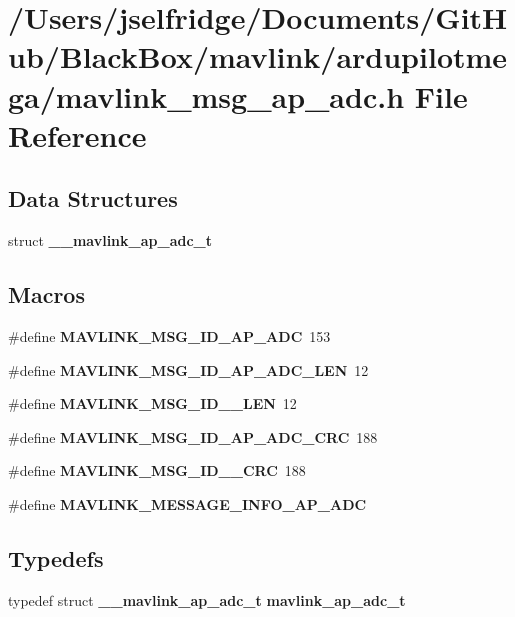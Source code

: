\section{/\+Users/jselfridge/\+Documents/\+Git\+Hub/\+Black\+Box/mavlink/ardupilotmega/mavlink\+\_\+msg\+\_\+ap\+\_\+adc.h File Reference}
\label{mavlink__msg__ap__adc_8h}
\subsection*{Data Structures}
\begin{DoxyCompactItemize}
\item 
struct \textbf{ \+\_\+\+\_\+mavlink\+\_\+ap\+\_\+adc\+\_\+t}
\end{DoxyCompactItemize}
\subsection*{Macros}
\begin{DoxyCompactItemize}
\item 
\#define \textbf{ M\+A\+V\+L\+I\+N\+K\+\_\+\+M\+S\+G\+\_\+\+I\+D\+\_\+\+A\+P\+\_\+\+A\+DC}~153
\item 
\#define \textbf{ M\+A\+V\+L\+I\+N\+K\+\_\+\+M\+S\+G\+\_\+\+I\+D\+\_\+\+A\+P\+\_\+\+A\+D\+C\+\_\+\+L\+EN}~12
\item 
\#define \textbf{ M\+A\+V\+L\+I\+N\+K\+\_\+\+M\+S\+G\+\_\+\+I\+D\+\_\+\_\+\+L\+EN}~12
\item 
\#define \textbf{ M\+A\+V\+L\+I\+N\+K\+\_\+\+M\+S\+G\+\_\+\+I\+D\+\_\+\+A\+P\+\_\+\+A\+D\+C\+\_\+\+C\+RC}~188
\item 
\#define \textbf{ M\+A\+V\+L\+I\+N\+K\+\_\+\+M\+S\+G\+\_\+\+I\+D\+\_\+\_\+\+C\+RC}~188
\item 
\#define \textbf{ M\+A\+V\+L\+I\+N\+K\+\_\+\+M\+E\+S\+S\+A\+G\+E\+\_\+\+I\+N\+F\+O\+\_\+\+A\+P\+\_\+\+A\+DC}
\end{DoxyCompactItemize}
\subsection*{Typedefs}
\begin{DoxyCompactItemize}
\item 
typedef struct \textbf{ \+\_\+\+\_\+mavlink\+\_\+ap\+\_\+adc\+\_\+t} \textbf{ mavlink\+\_\+ap\+\_\+adc\+\_\+t}
\end{DoxyCompactItemize}


